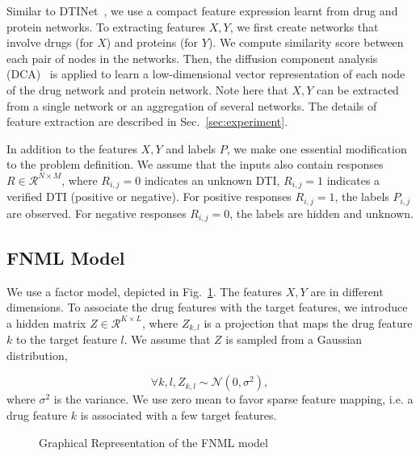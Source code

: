 \documentclass[conference]{IEEEtran}
\begin{document}
Similar to DTINet~\cite{Luo2017Network}, we use a compact feature expression learnt from drug and protein networks. To extracting features $X,Y$, we first create networks that involve drugs (for $X$) and proteins (for $Y$). We compute similarity score between each pair of nodes in the networks. Then, the diffusion component analysis (DCA)~\cite{Cho2015DCA} is applied to learn a low-dimensional vector representation of each node of the drug network and protein network. Note here that $X,Y$ can be extracted from a single network or an aggregation of several networks. The details of feature extraction are described in Sec.~\ref{sec:experiment}.



In addition to the features $X,Y$ and labels $P$, we make one essential modification to the problem definition. We assume that the inputs also contain responses $R\in \mathcal{R}^{N\times M}$, where $R_{i,j}=0$ indicates an unknown DTI, $R_{i,j}=1$ indicates a verified DTI (positive or negative). For positive responses $R_{i,j}=1$, the labels $P_{i,j}$ are observed. For negative responses $R_{i,j}=0$, the labels are hidden and unknown.

\subsection{FNML Model}\label{sec:model}

We use a factor model, depicted in Fig.~\ref{fig:model}. The features $X,Y$ are in different dimensions. To associate the drug features with the target features, we introduce a hidden matrix $Z\in\mathcal{R}^{K\times L}$, where $Z_{k,l}$ is a projection that maps the drug feature $k$ to the target feature $l$. We assume that $Z$ is sampled from a Gaussian distribution,

\begin{equation}\label{equ:z}
\forall k,l, Z_{k,l}\sim \mathcal{N}(0,\sigma^2),
\end{equation}
where $\sigma^2$ is the variance. We use zero mean to favor sparse feature mapping, i.e. a drug feature $k$ is associated with a few target features.

\begin{figure}
  \centering
{}
\vspace*{-5pt}
\caption{Graphical Representation of the FNML model}\label{fig:model}
\end{figure}
\end{document}
